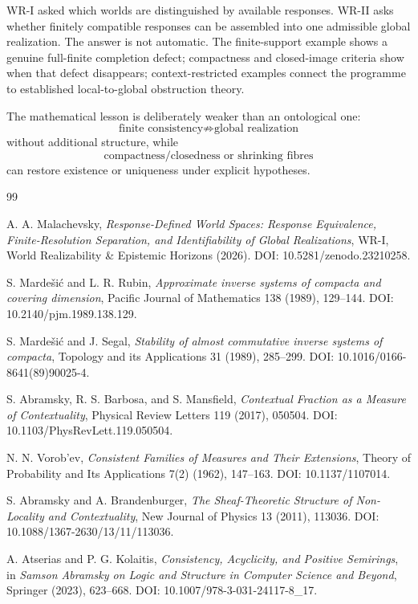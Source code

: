 \documentclass[11pt]{article}
\begin{document}
WR-I asked which worlds are distinguished by available responses. WR-II asks
whether finitely compatible responses can be assembled into one admissible
global realization. The answer is not automatic. The finite-support example
shows a genuine full-finite completion defect; compactness and closed-image
criteria show when that defect disappears; context-restricted examples connect
the programme to established local-to-global obstruction theory.

The mathematical lesson is deliberately weaker than an ontological one:
\[
\text{finite consistency}
\not\Rightarrow
\text{global realization}
\]
without additional structure, while
\[
\text{compactness/closedness or shrinking fibres}
\]
can restore existence or uniqueness under explicit hypotheses.

\begin{thebibliography}{99}

A. A. Malachevsky,
\emph{Response-Defined World Spaces: Response Equivalence,
Finite-Resolution Separation, and Identifiability of Global Realizations},
WR-I, World Realizability \& Epistemic Horizons (2026).
DOI: 10.5281/zenodo.23210258.


S. Marde\v{s}i\'c and L. R. Rubin,
\emph{Approximate inverse systems of compacta and covering dimension},
Pacific Journal of Mathematics 138 (1989), 129--144.
DOI: 10.2140/pjm.1989.138.129.

S. Marde\v{s}i\'c and J. Segal,
\emph{Stability of almost commutative inverse systems of compacta},
Topology and its Applications 31 (1989), 285--299.
DOI: 10.1016/0166-8641(89)90025-4.

S. Abramsky, R. S. Barbosa, and S. Mansfield,
\emph{Contextual Fraction as a Measure of Contextuality},
Physical Review Letters 119 (2017), 050504.
DOI: 10.1103/PhysRevLett.119.050504.

N. N. Vorob'ev,
\emph{Consistent Families of Measures and Their Extensions},
Theory of Probability and Its Applications 7(2) (1962), 147--163.
DOI: 10.1137/1107014.

S. Abramsky and A. Brandenburger,
\emph{The Sheaf-Theoretic Structure of Non-Locality and Contextuality},
New Journal of Physics 13 (2011), 113036.
DOI: 10.1088/1367-2630/13/11/113036.

A. Atserias and P. G. Kolaitis,
\emph{Consistency, Acyclicity, and Positive Semirings},
in \emph{Samson Abramsky on Logic and Structure in Computer Science and Beyond},
Springer (2023), 623--668.
DOI: 10.1007/978-3-031-24117-8\_17.

\end{thebibliography}
\end{document}

